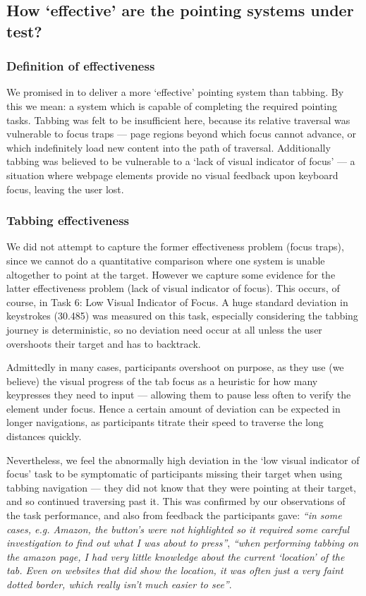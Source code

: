\documentclass[a4paper, 12pt]{report}
\begin{document}
\subsection{How `effective' are the pointing systems under test?}
\subsubsection{Definition of effectiveness}
We promised in  to deliver a more `effective' pointing system than tabbing. By this we mean: a system which is capable of completing the required pointing tasks. Tabbing was felt to be insufficient here, because its relative traversal was vulnerable to focus traps --- page regions beyond which focus cannot advance, or which indefinitely load new content into the path of traversal. Additionally tabbing was believed to be vulnerable to a `lack of visual indicator of focus' --- a situation where webpage elements provide no visual feedback upon keyboard focus, leaving the user lost.

\subsubsection{Tabbing effectiveness}
\label{sec:tabbing_effectiveness}
We did not attempt to capture the former effectiveness problem (focus traps), since we cannot do a quantitative comparison where one system is unable altogether to point at the target. However we capture some evidence for the latter effectiveness problem (lack of visual indicator of focus). This occurs, of course, in Task 6: Low Visual Indicator of Focus. A huge standard deviation in keystrokes (30.485) was measured on this task, especially considering the tabbing journey is deterministic, so no deviation need occur at all unless the user overshoots their target and has to backtrack.

Admittedly in many cases, participants overshoot on purpose, as they use (we believe) the visual progress of the tab focus as a heuristic for how many keypresses they need to input --- allowing them to pause less often to verify the element under focus. Hence a certain amount of deviation can be expected in longer navigations, as participants titrate their speed to traverse the long distances quickly.

Nevertheless, we feel the abnormally high deviation in the `low visual indicator of focus' task to be symptomatic of participants missing their target when using tabbing navigation --- they did not know that they were pointing at their target, and so continued traversing past it. This was confirmed by our observations of the task performance, and also from feedback the participants gave: \textit{``in some cases, e.g. Amazon, the button's were not highlighted so it required some careful investigation to find out what I was about to press''}, \textit{``when performing tabbing on the amazon page, I had very little knowledge about the current `location' of the tab. Even on websites that did show the location, it was often just a very faint dotted border, which really isn't much easier to see''}.
\end{document}
